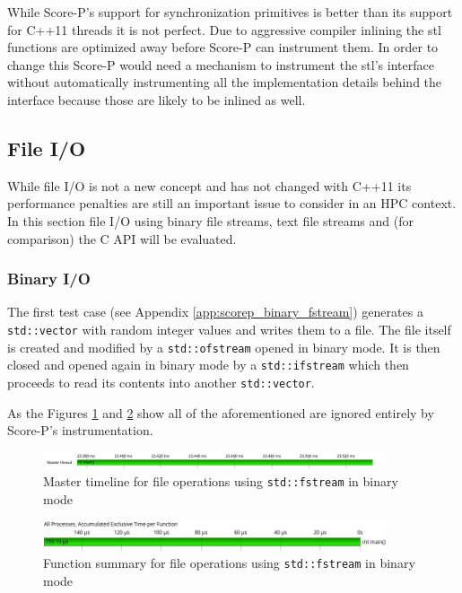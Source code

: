 While Score-P's support for synchronization primitives is better than its support for C++11 threads it is not perfect. Due to aggressive compiler inlining the \gls{stl} functions are optimized away before Score-P can instrument them. In order to change this Score-P would need a mechanism to instrument the \gls{stl}'s interface without automatically instrumenting all the implementation details behind the interface because those are likely to be inlined as well.

\subsection{File I/O}

While file I/O is not a new concept and has not changed with C++11 its performance penalties are still an important issue to consider in an HPC context. In this section file I/O using binary file streams, text file streams and (for comparison) the C API will be evaluated.

\subsubsection{Binary I/O}\label{scorep:binary_fstream}

The first test case (see Appendix \ref{app:scorep_binary_fstream}) generates a \texttt{std::vector} with random integer values and writes them to a file. The file itself is created and modified by a \texttt{std::ofstream} opened in binary mode. It is then closed and opened again in binary mode by a \texttt{std::ifstream} which then proceeds to read its contents into another \texttt{std::vector}.

As the Figures \ref{scorep:binary_fstream_timeline} and \ref{scorep:binary_fstream_summary} show all of the aforementioned  are ignored entirely by Score-P's instrumentation.

\begin{figure}[htbp]
	\begin{center}
		\includegraphics[width=0.9\textwidth]{img/scorep_binary_fstream_timeline.png}
		\caption{Master timeline for file operations using \texttt{std::fstream} in binary mode}
		\label{scorep:binary_fstream_timeline}
	\end{center}
\end{figure}

\begin{figure}[htbp]
	\begin{center}
		\includegraphics[width=0.9\textwidth]{img/scorep_binary_fstream_summary.png}
		\caption{Function summary for file operations using \texttt{std::fstream} in binary mode}
		\label{scorep:binary_fstream_summary}
	\end{center}
\end{figure}

